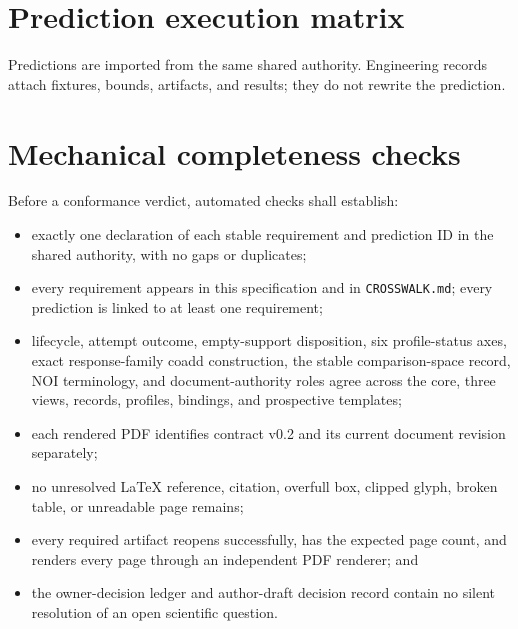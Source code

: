 \documentclass[10pt]{article}
\begin{document}
\clearpage
\section{Prediction execution matrix}\label{sec:predictions}

Predictions are imported from the same shared authority. Engineering records
attach fixtures, bounds, artifacts, and results; they do not rewrite the
prediction.

\renewcommand{\SCIMapPrediction}[4]{%
  \par\begin{minipage}{\linewidth}%
  \phantomsection\label{engpred:#1}%
  \noindent\textbf{\textcolor{EngNavy}{#1} -- #2}\par
  \textbf{Canonical prediction:} #3\par
  \textbf{Primary claim layer:} #4.\par
  \textbf{Fixture / bound / result:} \textcolor{EngGray}{\texttt{not\_assessed}; preregistration pending}\par
  \smallskip\hrule
  \end{minipage}\par\smallskip}
\SCIMapPredictions

\clearpage
\section{Mechanical completeness checks}

Before a conformance verdict, automated checks shall establish:

\begin{itemize}
\item exactly one declaration of each stable requirement and prediction ID in
the shared authority, with no gaps or duplicates;
\item every requirement appears in this specification and in
\texttt{CROSSWALK.md}; every prediction is linked to at least one requirement;
\item lifecycle, attempt outcome, empty-support disposition, six profile-status
axes, exact response-family coadd construction, the stable comparison-space
record, NOI terminology, and document-authority roles agree across the core,
three views, records, profiles, bindings, and prospective templates;
\item each rendered PDF identifies contract v0.2 and its current document
revision separately;
\item no unresolved LaTeX reference, citation, overfull box, clipped glyph,
broken table, or unreadable page remains;
\item every required artifact reopens successfully, has the expected page
count, and renders every page through an independent PDF renderer; and
\item the owner-decision ledger and author-draft decision record contain no
silent resolution of an open scientific question.
\end{itemize}
\end{document}

